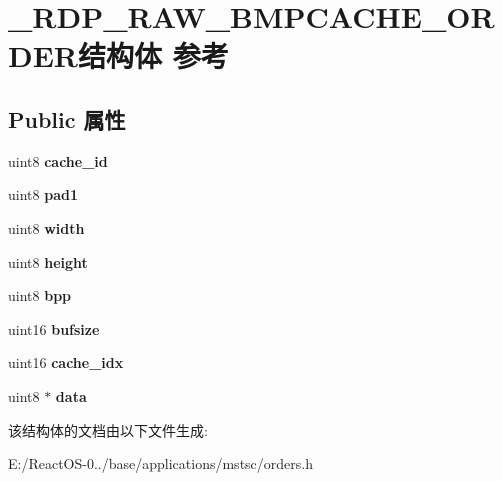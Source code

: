 \hypertarget{struct___r_d_p___r_a_w___b_m_p_c_a_c_h_e___o_r_d_e_r}{}\section{\+\_\+\+R\+D\+P\+\_\+\+R\+A\+W\+\_\+\+B\+M\+P\+C\+A\+C\+H\+E\+\_\+\+O\+R\+D\+E\+R结构体 参考}
\label{struct___r_d_p___r_a_w___b_m_p_c_a_c_h_e___o_r_d_e_r}
\subsection*{Public 属性}
\begin{DoxyCompactItemize}
\item 
\mbox{\label{struct___r_d_p___r_a_w___b_m_p_c_a_c_h_e___o_r_d_e_r_a036b7ebdd2619f80fa0943135993c323}} 
uint8 {\bfseries cache\+\_\+id}
\item 
\mbox{\label{struct___r_d_p___r_a_w___b_m_p_c_a_c_h_e___o_r_d_e_r_a510665bccf7039cec3f9746c49d8b90e}} 
uint8 {\bfseries pad1}
\item 
\mbox{\label{struct___r_d_p___r_a_w___b_m_p_c_a_c_h_e___o_r_d_e_r_aeade770a312786ed584fd1c9bf638df8}} 
uint8 {\bfseries width}
\item 
\mbox{\label{struct___r_d_p___r_a_w___b_m_p_c_a_c_h_e___o_r_d_e_r_ae92c6eda266e4dab7fd62995606a7c25}} 
uint8 {\bfseries height}
\item 
\mbox{\label{struct___r_d_p___r_a_w___b_m_p_c_a_c_h_e___o_r_d_e_r_a551c8355be500d61a8399a0d9095a5bb}} 
uint8 {\bfseries bpp}
\item 
\mbox{\label{struct___r_d_p___r_a_w___b_m_p_c_a_c_h_e___o_r_d_e_r_a7ce0f4959c41698567dc5332b8826db0}} 
uint16 {\bfseries bufsize}
\item 
\mbox{\label{struct___r_d_p___r_a_w___b_m_p_c_a_c_h_e___o_r_d_e_r_abf5639dedc95ea058e36495eb68c2371}} 
uint16 {\bfseries cache\+\_\+idx}
\item 
\mbox{\label{struct___r_d_p___r_a_w___b_m_p_c_a_c_h_e___o_r_d_e_r_a80df37bc96d6f6b1aa9a9823d32585ea}} 
uint8 $\ast$ {\bfseries data}
\end{DoxyCompactItemize}


该结构体的文档由以下文件生成\+:\begin{DoxyCompactItemize}
\item 
E\+:/\+React\+O\+S-\/0../base/applications/mstsc/orders.\+h\end{DoxyCompactItemize}
